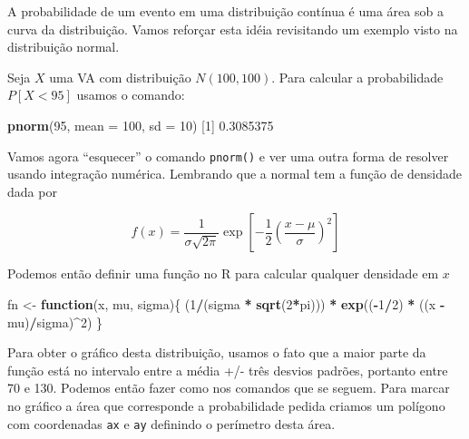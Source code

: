 \documentclass[10pt,a4paper]{book}
\newenvironment{Shaded}{\begin{snugshade}}{\end{snugshade}}
\newcommand{\KeywordTok}[1]{\textcolor[rgb]{0.13,0.29,0.53}{\textbf{#1}}}
\newcommand{\DataTypeTok}[1]{\textcolor[rgb]{0.13,0.29,0.53}{#1}}
\newcommand{\DecValTok}[1]{\textcolor[rgb]{0.00,0.00,0.81}{#1}}
\newcommand{\FloatTok}[1]{\textcolor[rgb]{0.00,0.00,0.81}{#1}}
\newcommand{\StringTok}[1]{\textcolor[rgb]{0.31,0.60,0.02}{#1}}
\newcommand{\ControlFlowTok}[1]{\textcolor[rgb]{0.13,0.29,0.53}{\textbf{#1}}}
\newcommand{\OperatorTok}[1]{\textcolor[rgb]{0.81,0.36,0.00}{\textbf{#1}}}
\newcommand{\NormalTok}[1]{#1}
\begin{document}
A probabilidade de um evento em uma distribuição contínua é uma área sob
a curva da distribuição. Vamos reforçar esta idéia revisitando um
exemplo visto na distribuição normal.

Seja \(X\) uma VA com distribuição \(N(100, 100)\). Para calcular a
probabilidade \(P[X < 95]\) usamos o comando:

\begin{Shaded}
\begin{Highlighting}[]
\KeywordTok{pnorm}\NormalTok{(}\DecValTok{95}\NormalTok{, }\DataTypeTok{mean =} \DecValTok{100}\NormalTok{, }\DataTypeTok{sd =} \DecValTok{10}\NormalTok{)}
\NormalTok{[}\DecValTok{1}\NormalTok{] }\FloatTok{0.3085375}
\end{Highlighting}
\end{Shaded}

Vamos agora ``esquecer'' o comando \texttt{pnorm()} e ver uma outra
forma de resolver usando integração numérica. Lembrando que a normal tem
a função de densidade dada por

\[
f(x) = \frac{1}{\sigma\sqrt{2 \pi}}\exp \left[ -\frac{1}{2}
    \left( \frac{x - \mu}{\sigma} \right)^2 \right]
\]

Podemos então definir uma função no R para calcular qualquer densidade
em \(x\)

\begin{Shaded}
\begin{Highlighting}[]
\NormalTok{fn <-}\StringTok{ }\ControlFlowTok{function}\NormalTok{(x, mu, sigma)\{}
\NormalTok{    (}\DecValTok{1}\OperatorTok{/}\NormalTok{(sigma }\OperatorTok{*}\StringTok{ }\KeywordTok{sqrt}\NormalTok{(}\DecValTok{2}\OperatorTok{*}\NormalTok{pi))) }\OperatorTok{*}\StringTok{ }\KeywordTok{exp}\NormalTok{((}\OperatorTok{-}\DecValTok{1}\OperatorTok{/}\DecValTok{2}\NormalTok{) }\OperatorTok{*}\StringTok{ }\NormalTok{((x }\OperatorTok{-}\StringTok{ }\NormalTok{mu)}\OperatorTok{/}\NormalTok{sigma)}\OperatorTok{^}\DecValTok{2}\NormalTok{)}
\NormalTok{\}}
\end{Highlighting}
\end{Shaded}

Para obter o gráfico desta distribuição, usamos o fato que a maior parte
da função está no intervalo entre a média +/- três desvios padrões,
portanto entre 70 e 130. Podemos então fazer como nos comandos que se
seguem. Para marcar no gráfico a área que corresponde a probabilidade
pedida criamos um polígono com coordenadas \texttt{ax} e \texttt{ay}
definindo o perímetro desta área.
\end{document}
